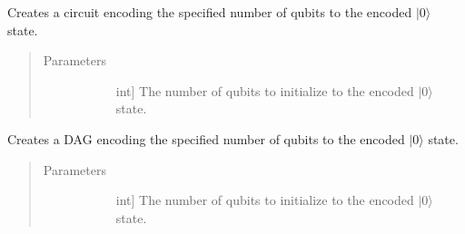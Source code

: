 \documentclass[letterpaper,10pt,english]{sphinxmanual}
\begin{document}
\begin{fulllineitems}
\begin{fulllineitems}
\label{\detokenize{Steane:Steane.SteaneEncoder.createEncoderCircuit}}
Creates a circuit encoding the specified number of qubits to the encoded \(|0\rangle\) state.
\begin{quote}\begin{description}
\item[{Parameters}] \leavevmode\begin{description}
\item[{}] \leavevmode{[}int{]}
The number of qubits to initialize to the encoded \(|0\rangle\) state.

\end{description}

\end{description}\end{quote}

\end{fulllineitems}


\begin{fulllineitems}
\label{\detokenize{Steane:Steane.SteaneEncoder.createEncoderDag}}
Creates a DAG encoding the specified number of qubits to the encoded \(|0\rangle\) state.
\begin{quote}\begin{description}
\item[{Parameters}] \leavevmode\begin{description}
\item[{}] \leavevmode{[}int{]}
The number of qubits to initialize to the encoded \(|0\rangle\) state.

\end{description}

\end{description}\end{quote}

\end{fulllineitems}



\end{fulllineitems}
\end{document}
